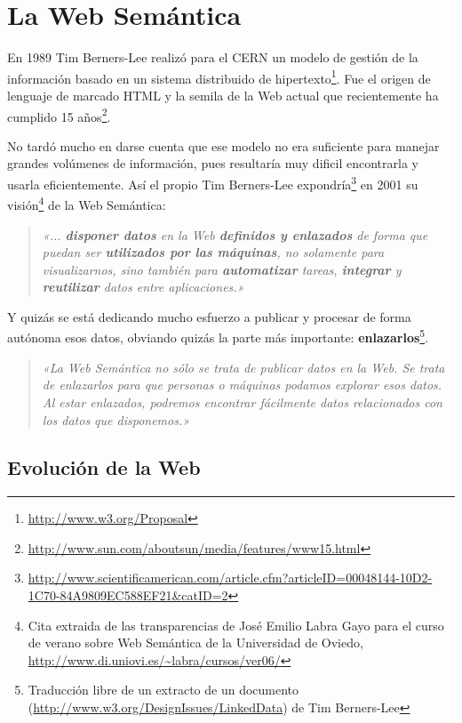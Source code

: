 
\section{La Web Semántica}

En 1989 Tim Berners-Lee realizó para el CERN un modelo de gestión de la 
información basado en un sistema distribuido de hipertexto\footnote{\url{http://www.w3.org/Proposal}}. 
Fue el origen de lenguaje de marcado HTML y la semila de la Web actual
que recientemente ha cumplido 15 años\footnote{\url{http://www.sun.com/aboutsun/media/features/www15.html}}.

No tardó mucho en darse cuenta que ese modelo no era suficiente para 
manejar grandes volúmenes de información, pues resultaría muy dificil 
encontrarla y usarla eficientemente. Así el propio Tim Berners-Lee 
expondría\footnote{\url{http://www.scientificamerican.com/article.cfm?articleID=00048144-10D2-1C70-84A9809EC588EF21&catID=2}}
en 2001 su visión\footnote{Cita extraida de las transparencias de José Emilio 
Labra Gayo para el curso de verano sobre Web Semántica de la Universidad de 
Oviedo, \url{http://www.di.uniovi.es/~labra/cursos/ver06/}} de la Web Semántica:

\begin{quote}
	\emph{«... \textbf{disponer datos} en la Web \textbf{definidos y enlazados} 
	de forma que puedan ser \textbf{utilizados por las máquinas}, no solamente 
	para visualizarnos, sino también para \textbf{automatizar} tareas, 
	\textbf{integrar} y \textbf{reutilizar} datos entre aplicaciones.»}
\end{quote} 

Y quizás se está dedicando mucho esfuerzo a publicar y procesar de forma autónoma
esos datos, obviando quizás la parte más importante: 
\textbf{enlazarlos}\footnote{Traducción libre de un extracto de un documento (\url{http://www.w3.org/DesignIssues/LinkedData}) de Tim Berners-Lee}.

\begin{quote}
	\emph{«La Web Semántica no sólo se trata de publicar datos en la Web. Se 
	trata de enlazarlos para que personas o máquinas podamos explorar esos 
	datos. Al estar enlazados, podremos encontrar fácilmente datos relacionados 
	con los datos que disponemos.»}
\end{quote}

\subsection{Evolución de la Web}

